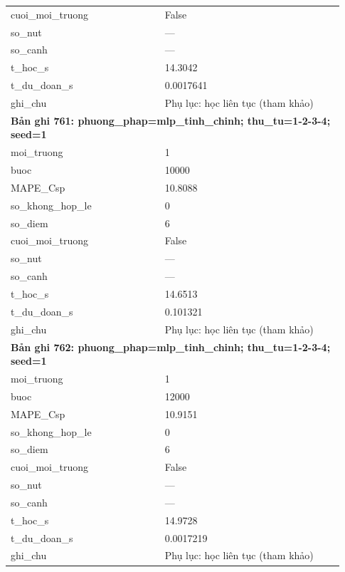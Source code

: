 \begin{longtable}{p{0.43\linewidth}p{0.50\linewidth}}
cuoi\_\allowbreak moi\_\allowbreak truong & False \\
so\_\allowbreak nut & — \\
so\_\allowbreak canh & — \\
t\_\allowbreak hoc\_\allowbreak s & 14.3042 \\
t\_\allowbreak du\_\allowbreak doan\_\allowbreak s & 0.0017641 \\
ghi\_\allowbreak chu & Phụ lục: học liên tục (tham khảo) \\
\midrule
\multicolumn{2}{p{0.95\linewidth}}{\textbf{Bản ghi 761: phuong\_phap=mlp\_tinh\_chinh; thu\_tu=1-2-3-4; seed=1}} \\
moi\_\allowbreak truong & 1 \\
buoc & 10000 \\
MAPE\_\allowbreak Csp & 10.8088 \\
so\_\allowbreak khong\_\allowbreak hop\_\allowbreak le & 0 \\
so\_\allowbreak diem & 6 \\
cuoi\_\allowbreak moi\_\allowbreak truong & False \\
so\_\allowbreak nut & — \\
so\_\allowbreak canh & — \\
t\_\allowbreak hoc\_\allowbreak s & 14.6513 \\
t\_\allowbreak du\_\allowbreak doan\_\allowbreak s & 0.101321 \\
ghi\_\allowbreak chu & Phụ lục: học liên tục (tham khảo) \\
\midrule
\multicolumn{2}{p{0.95\linewidth}}{\textbf{Bản ghi 762: phuong\_phap=mlp\_tinh\_chinh; thu\_tu=1-2-3-4; seed=1}} \\
moi\_\allowbreak truong & 1 \\
buoc & 12000 \\
MAPE\_\allowbreak Csp & 10.9151 \\
so\_\allowbreak khong\_\allowbreak hop\_\allowbreak le & 0 \\
so\_\allowbreak diem & 6 \\
cuoi\_\allowbreak moi\_\allowbreak truong & False \\
so\_\allowbreak nut & — \\
so\_\allowbreak canh & — \\
t\_\allowbreak hoc\_\allowbreak s & 14.9728 \\
t\_\allowbreak du\_\allowbreak doan\_\allowbreak s & 0.0017219 \\
ghi\_\allowbreak chu & Phụ lục: học liên tục (tham khảo) \\

\end{longtable}
